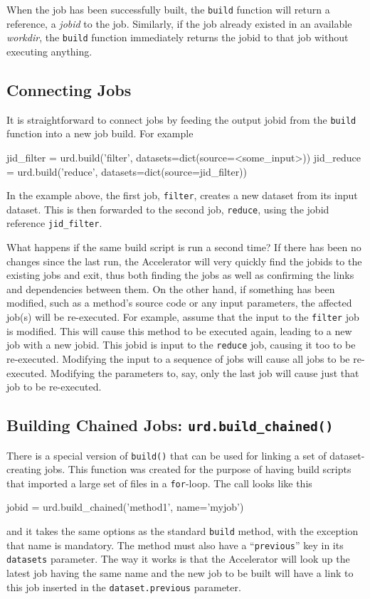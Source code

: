 When the job has been successfully built, the \texttt{build} function
will return a reference, a \textsl{jobid} to the job.  Similarly, if
the job already existed in an available \textsl{workdir}, the
\texttt{build} function immediately returns the jobid to that job
without executing anything.



\subsection{Connecting Jobs}
It is straightforward to connect jobs by feeding the output jobid from
the \texttt{build} function into a new job build.  For example
\begin{python}
jid_filter = urd.build('filter', datasets=dict(source=<some_input>))
jid_reduce = urd.build('reduce', datasets=dict(source=jid_filter))
\end{python}
In the example above, the first job, \texttt{filter}, creates a new
dataset from its input dataset.  This is then forwarded to the second
job, \texttt{reduce}, using the jobid reference \texttt{jid\_filter}.

What happens if the same build script is run a second time?  If there
has been no changes since the last run, the Accelerator will very
quickly find the jobids to the existing jobs and exit, thus both
finding the jobs as well as confirming the links and dependencies
between them.  On the other hand, if something has been modified, such
as a method's source code or any input parameters, the affected job(s)
will be re-executed.  For example, assume that the input to
the \texttt{filter} job is modified.  This will cause this method to
be executed again, leading to a new job with a new jobid.  This jobid
is input to the \texttt{reduce} job, causing it too to be re-executed.
Modifying the input to a sequence of jobs will cause all jobs to be
re-executed.  Modifying the parameters to, say, only the last job will
cause just that job to be re-executed.



\subsection{Building Chained Jobs: \texttt{urd.build\_chained()}}
There is a special version of \texttt{build()} that can be used for
linking a set of dataset-creating jobs.  This function was created for
the purpose of having build scripts that imported a large set of files
in a \texttt{for}-loop.  The call looks like this
\begin{python}
jobid = urd.build_chained('method1', name='myjob')
\end{python}
and it takes the same options as the standard \texttt{build} method,
with the exception that name is mandatory.  The method must also have
a ``\texttt{previous}'' key in its \texttt{datasets} parameter.  The
way it works is that the Accelerator will look up the latest job
having the same name and the new job to be built will have a link to
this job inserted in the \texttt{dataset.previous} parameter.



